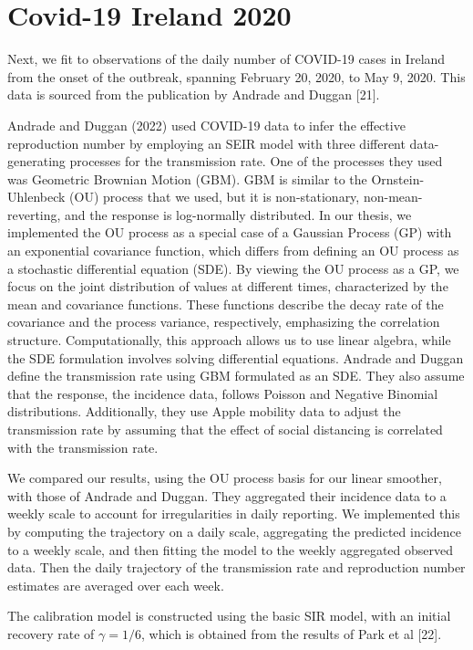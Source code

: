 \documentclass[
11pt, %
oneside, %
english, %
singlespacing, %
]{macthesis} %
\begin{document}
\section{Covid-19 Ireland 2020}\label{Ireland}

Next, we fit to observations of the daily number of COVID-19 cases in Ireland from the onset of the outbreak, spanning February 20, 2020, to May 9, 2020. This data is sourced from the publication by Andrade and Duggan {[}21{]}.

Andrade and Duggan (2022) used COVID-19 data to infer the effective reproduction number by employing an SEIR model with three different data-generating processes for the transmission rate. One of the processes they used was Geometric Brownian Motion (GBM). GBM is similar to the Ornstein-Uhlenbeck (OU) process that we used, but it is non-stationary, non-mean-reverting, and the response is log-normally distributed. In our thesis, we implemented the OU process as a special case of a Gaussian Process (GP) with an exponential covariance function, which differs from defining an OU process as a stochastic differential equation (SDE). By viewing the OU process as a GP, we focus on the joint distribution of values at different times, characterized by the mean and covariance functions. These functions describe the decay rate of the covariance and the process variance, respectively, emphasizing the correlation structure. Computationally, this approach allows us to use linear algebra, while the SDE formulation involves solving differential equations. Andrade and Duggan define the transmission rate using GBM formulated as an SDE. They also assume that the response, the incidence data, follows Poisson and Negative Binomial distributions. Additionally, they use Apple mobility data to adjust the transmission rate by assuming that the effect of social distancing is correlated with the transmission rate.

We compared our results, using the OU process basis for our linear smoother, with those of Andrade and Duggan. They aggregated their incidence data to a weekly scale to account for irregularities in daily reporting. We implemented this by computing the trajectory on a daily scale, aggregating the predicted incidence to a weekly scale, and then fitting the model to the weekly aggregated observed data. Then the daily trajectory of the transmission rate and reproduction number estimates are averaged over each week.

The calibration model is constructed using the basic SIR model, with an initial recovery rate of \(\gamma = 1/6\), which is obtained from the results of Park et al {[}22{]}.
\end{document}
